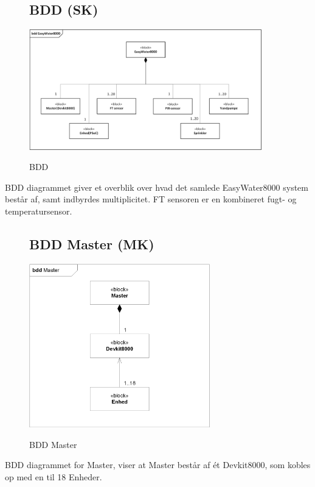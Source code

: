 \begin{figure}[H] \centering
\subsection{BDD (SK)}
{\includegraphics[width=0.9\textwidth]{filer/systemarkitektur/BDD}}
\caption{BDD}
\label{lab:bdd}
\raggedright
\end{figure}
BDD diagrammet giver et overblik over hvad det samlede EasyWater8000 system består af, samt indbyrdes multiplicitet. FT sensoren er en kombineret fugt- og temperatursensor.  \newline \newline

\begin{figure}[H] \centering
\subsection{BDD Master (MK)}
{\includegraphics[width=0.7\textwidth]{filer/systemarkitektur/BDD_Master}}
\caption{BDD Master}
\label{lab:bddmaster}
\raggedright
\end{figure}
BDD diagrammet for Master, viser at Master består af ét Devkit8000, som kobles op med en til 18 Enheder.

